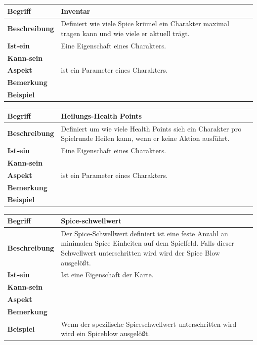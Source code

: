 \documentclass[12pt]{article}
\begin{document}
\begin{tabularx}{\linewidth}{|l|X|}
\hline
\textbf{Begriff} & \textbf{Inventar} \\
\hline
\textbf{Beschreibung} & Definiert wie viele Spice krümel ein Charakter maximal tragen kann und wie viele er aktuell trägt. \\
\hline
\textbf{Ist-ein} & Eine Eigenschaft eines Charakters.\\
\hline
\textbf{Kann-sein} & \\
\hline
\textbf{Aspekt} & ist ein Parameter eines Charakters. \\
\hline
\textbf{Bemerkung} & \\
\hline
\textbf{Beispiel} &  \\
\hline
\end{tabularx}

\begin{tabularx}{\linewidth}{|l|X|}
\hline
\textbf{Begriff} & \textbf{Heilungs-Health Points } \\
\hline
\textbf{Beschreibung} & Definiert um wie viele Health Points sich ein Charakter pro Spielrunde Heilen kann, wenn er keine Aktion ausführt. \\
\hline
\textbf{Ist-ein} & Eine Eigenschaft eines Charakters.\\
\hline
\textbf{Kann-sein} & \\
\hline
\textbf{Aspekt} & ist ein Parameter eines Charakters. \\
\hline
\textbf{Bemerkung} & \\
\hline
\textbf{Beispiel} &  \\
\hline
\end{tabularx}

\begin{tabularx}{\linewidth}{|l|X|}
\hline
\textbf{Begriff} & \textbf{Spice-schwellwert } \\
\hline
\textbf{Beschreibung} & Der Spice-Schwellwert definiert ist eine feste Anzahl an minimalen Spice Einheiten auf dem Spielfeld. Falls dieser Schwellwert unterschritten wird wird der Spice Blow ausgelößt. \\
\hline
\textbf{Ist-ein} & Ist eine Eigenschaft der Karte.\\
\hline
\textbf{Kann-sein} & \\
\hline
\textbf{Aspekt} &  \\
\hline
\textbf{Bemerkung} & \\
\hline
\textbf{Beispiel} & Wenn der spezifische Spiceschwellwert unterschritten wird wird ein Spiceblow ausgelößt. \\
\hline
\end{tabularx}
\end{document}
